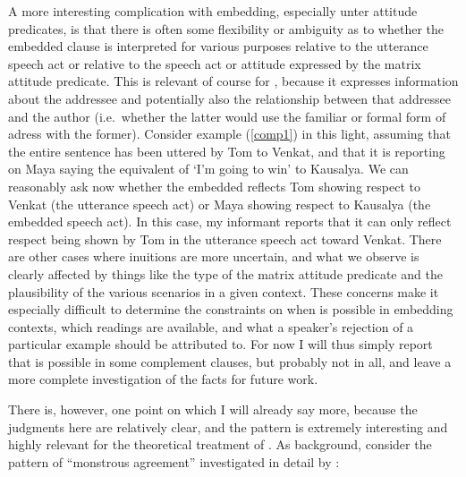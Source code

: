 \documentclass[output=paper, modfonts, nonflat]{langsci/langscibook}
\begin{document}
A more interesting complication with embedding, especially unter
attitude predicates, is that there is often some flexibility or
ambiguity as to whether the embedded clause is interpreted for various
purposes relative to the utterance speech act or relative to the
speech act or attitude expressed by the matrix attitude
predicate. This is relevant of course for \allagr, because it
expresses information about the addressee and potentially also the
relationship between that addressee and the author (i.e.\ whether the
latter would use the familiar or formal form of adress with the
former). Consider example (\ref{comp1}) in this light, assuming that
the entire sentence has been uttered by Tom to Venkat, and that it is
reporting on Maya saying the equivalent of `I'm going to win' to
Kausalya. We can reasonably ask now whether the embedded \allagr{}
reflects Tom showing respect to Venkat (the utterance speech act) or
Maya showing respect to Kausalya (the embedded speech act). In this
case, my informant reports that it can only reflect respect being
shown by Tom in the utterance speech act toward Venkat. There are
other cases where inuitions are more uncertain, and what we observe is
clearly affected by things like the type of the matrix attitude
predicate and the plausibility of the various scenarios in a given
context. These concerns make it especially difficult to determine the
constraints on when \allagr{} is possible in embedding contexts, which
readings are available, and what a speaker's rejection of a particular
example should be attributed to. For now I will thus simply report
that \allagr{} is possible in some complement clauses, but probably
not in all, and leave a more complete investigation of the facts for
future work.

There is, however, one point on which I will already say more, because
the judgments here are relatively clear, and the pattern is extremely
interesting and highly relevant for the theoretical treatment of
\allagr. As background, consider the pattern of ``monstrous agreement''
investigated in detail by \citet{sundaresan:diss}:
\end{document}
